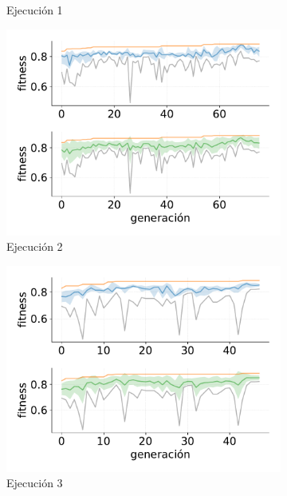 \begin{figure}[p]
\begin{subfigure}{0.47\textwidth}
        \caption{Ejecución 1}
    \end{subfigure}
    \hfill
    \begin{subfigure}{0.47\textwidth}
        \centering
        \includegraphics[width=\textwidth]{figuras/experimentos/exp9/ind_2.pdf}
        \caption{Ejecución 2}
    \end{subfigure}
    \hfill
    \begin{subfigure}{0.47\textwidth}
        \centering
        \includegraphics[width=\textwidth]{figuras/experimentos/exp9/ind_3.pdf}
        \caption{Ejecución 3}
    \end{subfigure}
    \hfill
    \begin{subfigure}{0.47\textwidth}
        \centering

\end{subfigure}
\end{figure}
